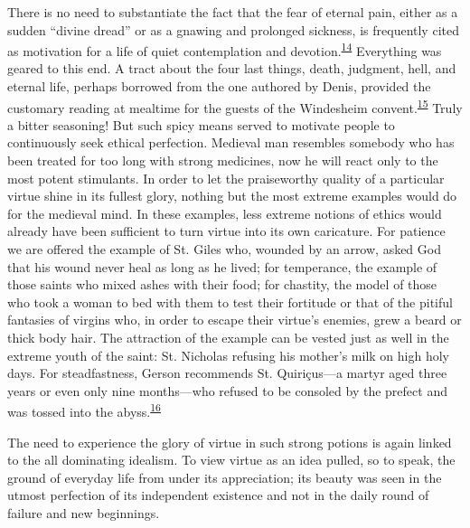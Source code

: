 There is no need to substantiate the fact that the fear of eternal pain,
either as a sudden ``divine dread'' or as a gnawing and prolonged
sickness, is frequently cited as motivation for a life of quiet
contemplation and
devotion.\textsuperscript{\protect\hypertarget{17_Chapter_Ten__THE_FAILURE_OF_IMAG.xhtmlux5cux23id_708}{\protect\hyperlink{23_NOTES.xhtmlux5cux23id_709}{14}}}
Everything was geared to this end. A tract about the four last things,
death, judgment, hell, and eternal life, perhaps borrowed from the one
authored by Denis, provided the customary reading at mealtime for the
guests of the Windesheim
convent.\textsuperscript{\protect\hypertarget{17_Chapter_Ten__THE_FAILURE_OF_IMAG.xhtmlux5cux23id_706}{\protect\hyperlink{23_NOTES.xhtmlux5cux23id_707}{15}}}
Truly a bitter seasoning! But such spicy means served to motivate people
to continuously seek ethical perfection. Medieval man resembles somebody
who has been treated for too long with strong medicines, now he will
react only to the most potent stimulants. In order to let the
praiseworthy quality of a particular virtue shine in its fullest glory,
nothing but the most extreme examples would do for the medieval mind. In
these examples, less extreme notions of ethics would already have been
sufficient to turn virtue into its own caricature. For patience we are
\protect\hypertarget{17_Chapter_Ten__THE_FAILURE_OF_IMAG.xhtmlux5cux23page_254}{}{}offered
the example of St. Giles who, wounded by an arrow, asked God that his
wound never heal as long as he lived; for temperance, the example of
those saints who mixed ashes with their food; for chastity, the model of
those who took a woman to bed with them to test their fortitude or that
of the pitiful fantasies of virgins who, in order to escape their
virtue's enemies, grew a beard or thick body hair. The attraction of the
example can be vested just as well in the extreme youth of the saint:
St. Nicholas refusing his mother's milk on high holy days. For
steadfastness, Gerson recommends St. Quiriçus---a martyr aged three
years or even only nine months---who refused to be consoled by the
prefect and was tossed into the
abyss.\textsuperscript{\protect\hypertarget{17_Chapter_Ten__THE_FAILURE_OF_IMAG.xhtmlux5cux23id_704}{\protect\hyperlink{23_NOTES.xhtmlux5cux23id_705}{16}}}

The need to experience the glory of virtue in such strong potions is
again linked to the all dominating idealism. To view virtue as an idea
pulled, so to speak, the ground of everyday life from under its
appreciation; its beauty was seen in the utmost perfection of its
independent existence and not in the daily round of failure and new
beginnings.

